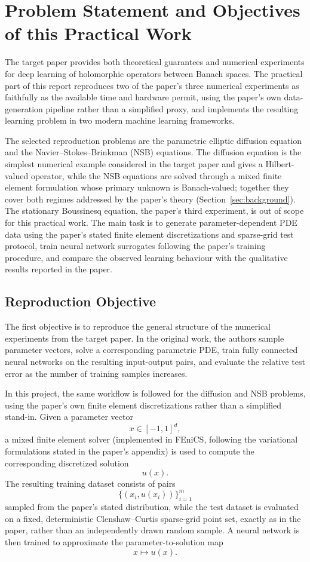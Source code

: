 \cleardoubleoddpage%
\chapter{Problem Statement and Objectives of this Practical Work}
\label{sec:problemStatement}
The target paper provides both theoretical guarantees and numerical experiments for deep learning of holomorphic operators between Banach spaces. The practical part of this report reproduces two of the paper's three numerical experiments as faithfully as the available time and hardware permit, using the paper's own data-generation pipeline rather than a simplified proxy, and implements the resulting learning problem in two modern machine learning frameworks.

The selected reproduction problems are the parametric elliptic diffusion equation and the Navier--Stokes--Brinkman (NSB) equations. The diffusion equation is the simplest numerical example considered in the target paper and gives a Hilbert-valued operator, while the NSB equations are solved through a mixed finite element formulation whose primary unknown is Banach-valued; together they cover both regimes addressed by the paper's theory (Section~\ref{sec:background}). The stationary Boussinesq equation, the paper's third experiment, is out of scope for this practical work. The main task is to generate parameter-dependent PDE data using the paper's stated finite element discretizations and sparse-grid test protocol, train neural network surrogates following the paper's training procedure, and compare the observed learning behaviour with the qualitative results reported in the paper.

\section{Reproduction Objective}
The first objective is to reproduce the general structure of the numerical
experiments from the target paper. In the original work, the authors sample parameter vectors, solve a corresponding parametric PDE, train fully connected neural networks on the resulting input-output pairs, and evaluate the relative test error as the number of training samples increases.

In this project, the same workflow is followed for the diffusion and NSB
problems, using the paper's own finite element discretizations rather than
a simplified stand-in. Given a parameter vector
\[
    x \in [-1,1]^d,
\]
a mixed finite element solver (implemented in FEniCS, following the
variational formulations stated in the paper's appendix) is used to compute
the corresponding discretized solution
\[
    u(x).
\]
The resulting training dataset consists of pairs
\[
    \{(x_i,u(x_i))\}_{i=1}^{m}
\]
sampled from the paper's stated distribution, while the test dataset is
evaluated on a fixed, deterministic Clenshaw--Curtis sparse-grid point set,
exactly as in the paper, rather than an independently drawn random sample.
A neural network is then trained to approximate the parameter-to-solution map
\[
    x \mapsto u(x).
\]

